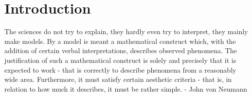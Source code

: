 \chapter{Introduction}


\begin{fancyquotes}
    The sciences do not try to explain, they hardly even try to interpret, they
    mainly make models. By a model is meant a mathematical construct which, with
    the addition of certain verbal interpretations, describes observed
    phenomena. The justification of such a mathematical construct is solely and
    precisely that it is expected to work - that is correctly to describe
    phenomena from a reasonably wide area. Furthermore, it must satisfy certain
    aesthetic criteria - that is, in relation to how much it describes, it must
    be rather simple. - John von Neumann
\end{fancyquotes}